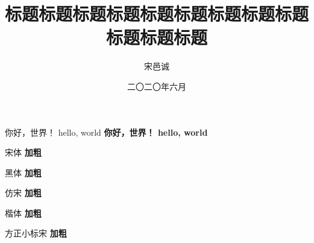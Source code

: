\documentclass[single]{HBUThesis}
\date{二〇二〇年六月}
\title{标题标题标题标题标题标题标题标题标题标题标题标题}
\author{宋邑诚}
\begin{document}
\makecover
\makeEncover

\orgState

你好，世界！
hello, world
\textbf{
  你好，世界！
  hello, world
}

\songti 宋体 \textbf{加粗}

\heiti 黑体 \textbf{加粗}

\fangsong 仿宋 \textbf{加粗}

\kaiti 楷体 \textbf{加粗}

\FZXBSong 方正小标宋 \textbf{加粗}
\end{document}
